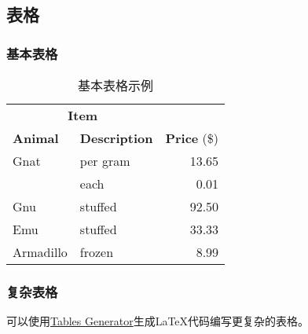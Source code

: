 \subsection{表格}

\subsubsection{基本表格}

\begin{table}[!hpt]
    \caption{基本表格示例}
    \centering
    \begin{tabular}{@{}llr@{}} \toprule
        \multicolumn{2}{c}{\textbf{Item}}                            \\ \cmidrule(r){1-2}
        \textbf{Animal} & \textbf{Description} & \textbf{Price} (\$) \\ \midrule
        Gnat            & per gram             & 13.65               \\
                        & each                 & 0.01                \\
        Gnu             & stuffed              & 92.50               \\
        Emu             & stuffed              & 33.33               \\
        Armadillo       & frozen               & 8.99                \\ \bottomrule
    \end{tabular}
\end{table}

\subsubsection{复杂表格}

可以使用\href{https://www.tablesgenerator.com}{Tables Generator}生成\LaTeX{}代码编写更复杂的表格。

